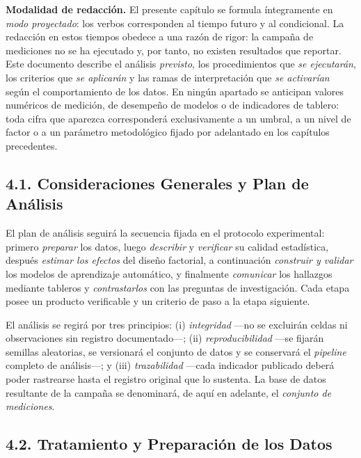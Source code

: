 \documentclass[
  12pt,
]{article}
\begin{document}
\textbf{Modalidad de redacción.} El presente capítulo se formula
íntegramente en \emph{modo proyectado}: los verbos corresponden al
tiempo futuro y al condicional. La redacción en estos tiempos obedece a
una razón de rigor: la campaña de mediciones no se ha ejecutado y, por
tanto, no existen resultados que reportar. Este documento describe el
análisis \emph{previsto}, los procedimientos que \emph{se ejecutarán},
los criterios que \emph{se aplicarán} y las ramas de interpretación que
\emph{se activarían} según el comportamiento de los datos. En ningún
apartado se anticipan valores numéricos de medición, de desempeño de
modelos o de indicadores de tablero: toda cifra que aparezca
corresponderá exclusivamente a un umbral, a un nivel de factor o a un
parámetro metodológico fijado por adelantado en los capítulos
precedentes.

\subsection{4.1. Consideraciones Generales y Plan de
Análisis}\label{consideraciones-generales-y-plan-de-anuxe1lisis}

El plan de análisis seguirá la secuencia fijada en el protocolo
experimental: primero \emph{preparar} los datos, luego \emph{describir}
y \emph{verificar} su calidad estadística, después \emph{estimar los
efectos} del diseño factorial, a continuación \emph{construir y validar}
los modelos de aprendizaje automático, y finalmente \emph{comunicar} los
hallazgos mediante tableros y \emph{contrastarlos} con las preguntas de
investigación. Cada etapa posee un producto verificable y un criterio de
paso a la etapa siguiente.

El análisis se regirá por tres principios: (i) \emph{integridad} —no se
excluirán celdas ni observaciones sin registro documentado—; (ii)
\emph{reproducibilidad} —se fijarán semillas aleatorias, se versionará
el conjunto de datos y se conservará el \emph{pipeline} completo de
análisis—; y (iii) \emph{trazabilidad} —cada indicador publicado deberá
poder rastrearse hasta el registro original que lo sustenta. La base de
datos resultante de la campaña se denominará, de aquí en adelante, el
\emph{conjunto de mediciones}.

\subsection{4.2. Tratamiento y Preparación de los
Datos}\label{tratamiento-y-preparaciuxf3n-de-los-datos}
\end{document}
